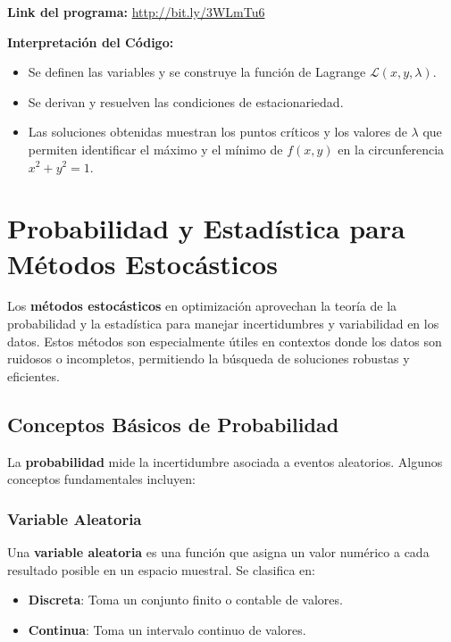 \documentclass[12pt,a4,oneside]{book}
\begin{document}
	\textbf{Link del programa:} \url{http://bit.ly/3WLmTu6}
	
	\textbf{Interpretación del Código:}  
	\begin{itemize}
		\item Se definen las variables y se construye la función de Lagrange \(\mathcal{L}(x,y,\lambda)\).
		\item Se derivan y resuelven las condiciones de estacionariedad.
		\item Las soluciones obtenidas muestran los puntos críticos y los valores de \(\lambda\) que permiten identificar el máximo y el mínimo de \(f(x,y)\) en la circunferencia \(x^2+y^2=1\).
	\end{itemize}
	
	\section{Probabilidad y Estadística para Métodos Estocásticos}
	
	Los \textbf{métodos estocásticos} en optimización aprovechan la teoría de la probabilidad y la estadística para manejar incertidumbres y variabilidad en los datos. Estos métodos son especialmente útiles en contextos donde los datos son ruidosos o incompletos, permitiendo la búsqueda de soluciones robustas y eficientes.
	
	\subsection{Conceptos Básicos de Probabilidad}
	
	La \textbf{probabilidad} mide la incertidumbre asociada a eventos aleatorios. Algunos conceptos fundamentales incluyen:
	
	\subsubsection{Variable Aleatoria}
	
	Una \textbf{variable aleatoria} es una función que asigna un valor numérico a cada resultado posible en un espacio muestral. Se clasifica en:
	\begin{itemize}
		\item \textbf{Discreta}: Toma un conjunto finito o contable de valores.
		\item \textbf{Continua}: Toma un intervalo continuo de valores.
	\end{itemize}
	
\end{document}
